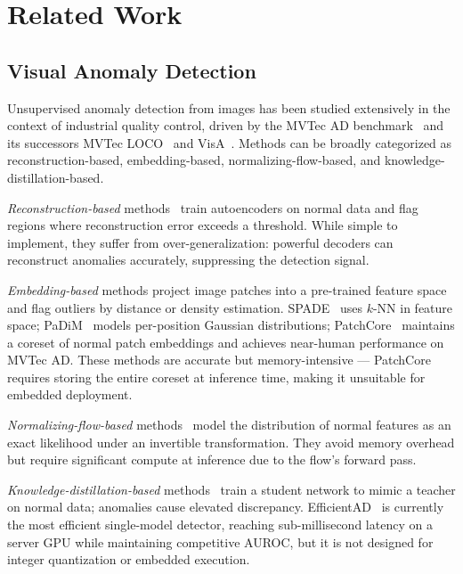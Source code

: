 \documentclass[journal]{IEEEtran}
\begin{document}
\section{Related Work}
\label{sec:related}

\subsection{Visual Anomaly Detection}

Unsupervised anomaly detection from images has been studied extensively in the
context of industrial quality control, driven by the MVTec AD
benchmark~\cite{bergmann2019mvtec} and its successors
MVTec LOCO~\cite{bergmann2022beyond} and
VisA~\cite{zou2022spot}.
Methods can be broadly categorized as reconstruction-based, embedding-based,
normalizing-flow-based, and knowledge-distillation-based.

\textit{Reconstruction-based} methods~\cite{bergmann2019improving,
baur2021autoencoders} train autoencoders on normal data and flag regions
where reconstruction error exceeds a threshold.
While simple to implement, they suffer from over-generalization: powerful
decoders can reconstruct anomalies accurately, suppressing the detection
signal.

\textit{Embedding-based} methods project image patches into a
pre-trained feature space and flag outliers by distance or density estimation.
SPADE~\cite{cohen2020sub} uses $k$-NN in feature space;
PaDiM~\cite{defard2021padim} models per-position Gaussian distributions;
PatchCore~\cite{roth2022towards} maintains a coreset of normal patch
embeddings and achieves near-human performance on MVTec AD.
These methods are accurate but memory-intensive — PatchCore requires storing
the entire coreset at inference time, making it unsuitable for embedded
deployment.

\textit{Normalizing-flow-based} methods~\cite{gudovskiy2022cflow,
yu2021fastflow,rudolph2022csflow} model the distribution of normal features
as an exact likelihood under an invertible transformation.
They avoid memory overhead but require significant compute at inference due
to the flow's forward pass.

\textit{Knowledge-distillation-based} methods~\cite{bergmann2020uninformed,
wang2021student,batzner2024efficientad} train a student network to mimic a
teacher on normal data; anomalies cause elevated discrepancy.
EfficientAD~\cite{batzner2024efficientad} is currently the most efficient
single-model detector, reaching sub-millisecond latency on a server GPU while
maintaining competitive AUROC, but it is not designed for integer quantization
or embedded execution.
\end{document}

